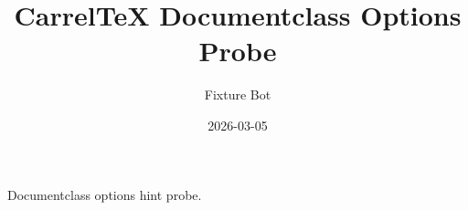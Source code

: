 \documentclass[twoside,openright]{memoir}
\title{CarrelTeX Documentclass Options Probe}
\author{Fixture Bot}
\date{2026-03-05}
\begin{document}
\maketitle

Documentclass options hint probe.
\end{document}
